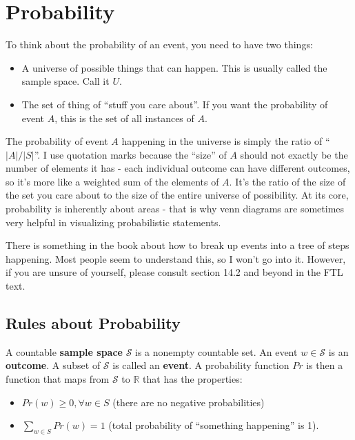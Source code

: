 \documentclass[11pt]{article}
\begin{document}
\section{Probability}
	To think about the probability of an event, you need to have two things:
	
	\begin{itemize}
		\item A universe of possible things that can happen.  This is usually called the sample space.  Call it $U$.  
		\item The set of thing of ``stuff you care about''.  If you want the probability of event $A$, this is the set of all instances of $A$.
	\end{itemize}
	
	The probability of event $A$ happening in the universe is simply the ratio of ``$|A|/|S|$''.  I use quotation marks because the ``size'' of $A$ should not exactly be the number of elements it has - each individual outcome can have different outcomes, so it's more like a weighted sum of the elements of $A$.  It's the ratio of the size of the set you care about to the size of the entire
	universe of possibility.  At its core, probability is inherently about areas - that is why venn diagrams are sometimes very helpful in visualizing probabilistic statements.
		
	There is something in the book about how to break up events into a tree of steps happening.  Most people seem to understand this, so I won't go into it.  However, if you are unsure of
	yourself, please consult section 14.2 and beyond in the FTL text.
	
	\subsection{Rules about Probability}
	
	A countable \textbf{sample space} $\mathcal{S}$ is a nonempty countable set.  An event
	$w \in \mathcal{S}$ is an \textbf{outcome}.  A subset of $\mathcal{S}$ is called an
	\textbf{event}.  A probability function $Pr$ is then a function that maps from
	$\mathcal{S}$ to $\mathbb{R}$ that has the properties:
	
	\begin{itemize}
		\item $Pr(w) \geq 0, \forall w \in S$ (there are no negative probabilities)
		\item $\sum_{w \in S} Pr(w) = 1$ (total probability of ``something happening'' is 1).
	\end{itemize}
	
\end{document}
